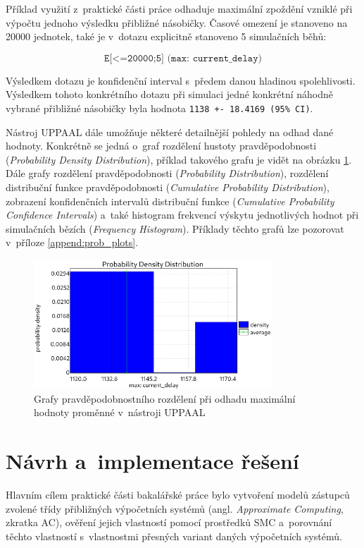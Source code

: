 Příklad využití z~praktické části práce odhaduje maximální zpoždění vzniklé při výpočtu jednoho výsledku přibližné násobičky. Časové omezení je stanoveno na 20000 jednotek, také je v~dotazu explicitně stanoveno 5 simulačních běhů:

\begin{equation*}
    \texttt{E[<=20000;5] (max: current\_delay)}
\end{equation*}

Výsledkem dotazu je konfidenční interval s~předem danou hladinou spolehlivosti. Výsledkem tohoto konkrétního dotazu při simulaci jedné konkrétní náhodně vybrané přibližné násobičky byla hodnota \texttt{1138 +- 18.4169 (95\% CI)}. 

Nástroj UPPAAL dále umožňuje některé detailnější pohledy na odhad dané hodnoty. Konkrétně se jedná o~graf rozdělení hustoty pravděpodobnosti (\textit{Probability Density Distribution}), příklad takového grafu je vidět na obrázku \ref{fig:plot_prob_dens_dist}. Dále grafy rozdělení pravděpodobnosti (\textit{Probability Distribution}), rozdělení distribuční funkce pravděpodobnosti (\textit{Cumulative Probability Distribution}), zobrazení konfidenčních intervalů distribuční funkce (\textit{Cumulative Probability Confidence Intervals}) a~také histogram frekvencí výskytu jednotlivých hodnot při simulačních bězích (\textit{Frequency Histogram}). Příklady těchto grafů lze pozorovat v~příloze \ref{append:prob_plots}.

\begin{figure}[H]
    \centering
    \includegraphics[width=0.8\textwidth]{obrazky-figures/plot_prob_dens_dist.png}
    \caption{Grafy pravděpodobnostního rozdělení při odhadu maximální hodnoty proměnné v~nástroji UPPAAL}
    \label{fig:plot_prob_dens_dist}
\end{figure}

\chapter{Návrh a~implementace řešení}
\label{rozbor}
Hlavním cílem praktické části bakalářské práce bylo vytvoření modelů zástupců zvolené třídy přibližných výpočetních systémů (angl. \textit{Approximate Computing}, zkratka AC), ověření jejich vlastností pomocí prostředků SMC a~porovnání těchto vlastností s~vlastnostmi přesných variant daných výpočetních systémů.

